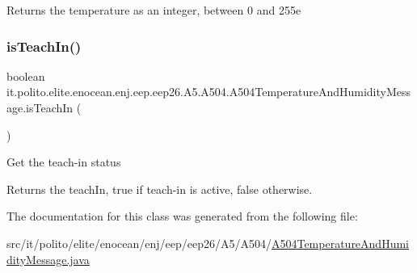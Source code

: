 \begin{DoxyReturn}{Returns}
the temperature as an integer, between 0 and 255e 
\end{DoxyReturn}
\hypertarget{classit_1_1polito_1_1elite_1_1enocean_1_1enj_1_1eep_1_1eep26_1_1_a5_1_1_a504_1_1_a504_temperature_and_humidity_message_a78cbbdd322eac7e78f2cba43cbe6f75c}{}\label{classit_1_1polito_1_1elite_1_1enocean_1_1enj_1_1eep_1_1eep26_1_1_a5_1_1_a504_1_1_a504_temperature_and_humidity_message_a78cbbdd322eac7e78f2cba43cbe6f75c} 
\subsubsection{\texorpdfstring{is\+Teach\+In()}{isTeachIn()}}
{\footnotesize\ttfamily boolean it.\+polito.\+elite.\+enocean.\+enj.\+eep.\+eep26.\+A5.\+A504.\+A504\+Temperature\+And\+Humidity\+Message.\+is\+Teach\+In (\begin{DoxyParamCaption}{ }\end{DoxyParamCaption})}

Get the teach-\/in status

\begin{DoxyReturn}{Returns}
the teach\+In, true if teach-\/in is active, false otherwise. 
\end{DoxyReturn}


The documentation for this class was generated from the following file\+:\begin{DoxyCompactItemize}
\item 
src/it/polito/elite/enocean/enj/eep/eep26/\+A5/\+A504/\hyperlink{_a504_temperature_and_humidity_message_8java}{A504\+Temperature\+And\+Humidity\+Message.\+java}\end{DoxyCompactItemize}
